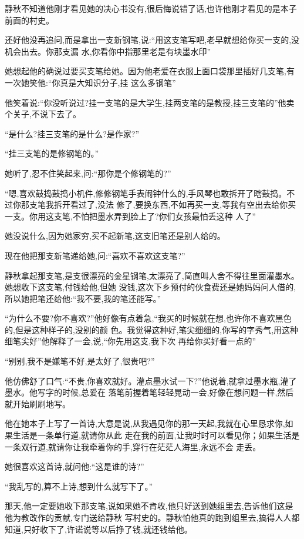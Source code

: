 ﻿\documentclass[12pt]{article}
\begin{document}
静秋不知道他刚才看见她的决心书没有,很后悔说错了话,也许他刚才看见的是本子前面的村史。

还好他没再追问,而是拿出一支新钢笔,说:``用这支笔写吧,老早就想给你买一支的,没机会出去\myrule 。你那支漏
水,你看你中指那里老是有块墨水印\myrule ''

她想起他的确说过要买支笔给她。因为他老爱在衣服上面口袋那里插好几支笔,有一次她笑他:``你真是大知识分子,挂
这么多钢笔\myrule ''

他笑着说:``你没听说过?挂一支笔的是大学生,挂两支笔的是教授,挂三支笔的\myrule ''他卖个关子,不说下去了。

``是什么?挂三支笔的是什么?是作家?''

``挂三支笔的是修钢笔的。''

她听了,忍不住笑起来,问:``那你是个修钢笔的?''

``嗯,喜欢鼓捣鼓捣小机件,修修钢笔手表闹钟什么的,手风琴也敢拆开了瞎鼓捣。不过你那支笔我拆开看过了,没法
修了,要换东西,不如再买一支,等我有空出去给你买一支。你用这支笔,不怕把墨水弄到脸上了?你们女孩最怕丢这种
人了\myrule ''

她没说什么,因为她家穷,买不起新笔,这支旧笔还是别人给的。

现在他把那支新笔递给她,问:``喜欢不喜欢这支笔?''

静秋拿起那支笔,是支很漂亮的金星钢笔,太漂亮了,简直叫人舍不得往里面灌墨水。她想收下这支笔,付钱给他,但她
没钱,这次下乡预付的伙食费还是她妈妈问人借的,所以她把笔还给他:``我不要,我的笔还能写。''

``为什么不要?你不喜欢?''他好像有点着急,``我买的时候就在想,也许你不喜欢黑色的,但是这种样子的,没别的颜
色。我觉得这种好,笔尖细细的,你写的字秀气,用这种细笔尖好\myrule ''他解释了一会,说,``你先用这支,我下次
再给你买好看一点的\myrule ''

``别\myrule 别,我不是嫌笔不好,是太\myrule 好了,很贵吧?''

他仿佛舒了口气:``不贵,你喜欢就好。灌点墨水试一下?''他说着,就拿过墨水瓶,灌了墨水。他写字的时候,总爱在
落笔前握着笔轻轻晃动一会,好像在想问题一样,然后就开始刷刷地写。

他在她本子上写了一首诗,大意是说,从我遇见你的那一天起,我就在心里恳求你,如果生活是一条单行道,就请你从此
走在我的前面,让我时时可以看见你；如果生活是一条双行道,就请你让我牵着你的手,穿行在茫茫人海里,永远不会
走丢。

她很喜欢这首诗,就问他:``这是谁的诗?''

``我乱写的,算不上诗,想到什么就写下了。''

那天,他一定要她收下那支笔,说如果她不肯收,他只好送到她组里去,告诉他们这是他为教改作的贡献,专门送给静秋
写村史的。静秋怕他真的跑到组里去,搞得人人都知道,只好收下了,许诺说等以后挣了钱,就还钱给他。
\end{document}
